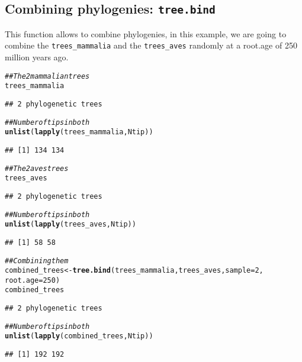 \documentclass{article}\usepackage[]{graphicx}\usepackage[]{color}
\makeatletter
\newcommand{\hlnum}[1]{\textcolor[rgb]{0.686,0.059,0.569}{#1}}%
\newcommand{\hlcom}[1]{\textcolor[rgb]{0.678,0.584,0.686}{\textit{#1}}}%
\newcommand{\hlstd}[1]{\textcolor[rgb]{0.345,0.345,0.345}{#1}}%
\newcommand{\hlkwb}[1]{\textcolor[rgb]{0.69,0.353,0.396}{#1}}%
\newcommand{\hlkwc}[1]{\textcolor[rgb]{0.333,0.667,0.333}{#1}}%
\newcommand{\hlkwd}[1]{\textcolor[rgb]{0.737,0.353,0.396}{\textbf{#1}}}%
\newenvironment{kframe}{%
 \def\at@end@of@kframe{}%
 \ifinner\ifhmode%
  \def\at@end@of@kframe{\end{minipage}}%
  \begin{minipage}{\columnwidth}%
 \fi\fi%
 \def\FrameCommand##1{\hskip\@totalleftmargin \hskip-\fboxsep
 \colorbox{shadecolor}{##1}\hskip-\fboxsep
     \hskip-\linewidth \hskip-\@totalleftmargin \hskip\columnwidth}%
 \MakeFramed {\advance\hsize-\width
   \@totalleftmargin\z@ \linewidth\hsize
   \@setminipage}}%
 {\par\unskip\endMakeFramed%
 \at@end@of@kframe}
\newenvironment{knitrout}{}{} %
\makeatother
\begin{document}
\subsection{Combining phylogenies: \texttt{tree.bind}}
This function allows to combine phylogenies, in this example, we are going to combine the \texttt{trees\_mammalia} and the \texttt{trees\_aves} randomly at a root.age of 250 million years ago.

\begin{knitrout}
\color{fgcolor}\begin{kframe}
\begin{alltt}
\hlcom{## The 2 mammalian trees}
\hlstd{trees_mammalia}
\end{alltt}
\begin{verbatim}
## 2 phylogenetic trees
\end{verbatim}
\begin{alltt}
\hlcom{## Number of tips in both}
\hlkwd{unlist}\hlstd{(}\hlkwd{lapply}\hlstd{(trees_mammalia, Ntip))}
\end{alltt}
\begin{verbatim}
## [1] 134 134
\end{verbatim}
\begin{alltt}
\hlcom{## The 2 aves trees}
\hlstd{trees_aves}
\end{alltt}
\begin{verbatim}
## 2 phylogenetic trees
\end{verbatim}
\begin{alltt}
\hlcom{## Number of tips in both}
\hlkwd{unlist}\hlstd{(}\hlkwd{lapply}\hlstd{(trees_aves, Ntip))}
\end{alltt}
\begin{verbatim}
## [1] 58 58
\end{verbatim}
\begin{alltt}
\hlcom{## Combining them}
\hlstd{combined_trees} \hlkwb{<-} \hlkwd{tree.bind}\hlstd{(trees_mammalia, trees_aves,} \hlkwc{sample} \hlstd{=} \hlnum{2}\hlstd{,}
    \hlkwc{root.age} \hlstd{=} \hlnum{250}\hlstd{)}
\hlstd{combined_trees}
\end{alltt}
\begin{verbatim}
## 2 phylogenetic trees
\end{verbatim}
\begin{alltt}
\hlcom{## Number of tips in both}
\hlkwd{unlist}\hlstd{(}\hlkwd{lapply}\hlstd{(combined_trees, Ntip))}
\end{alltt}
\begin{verbatim}
## [1] 192 192
\end{verbatim}
\end{kframe}
\end{knitrout}
\end{document}
